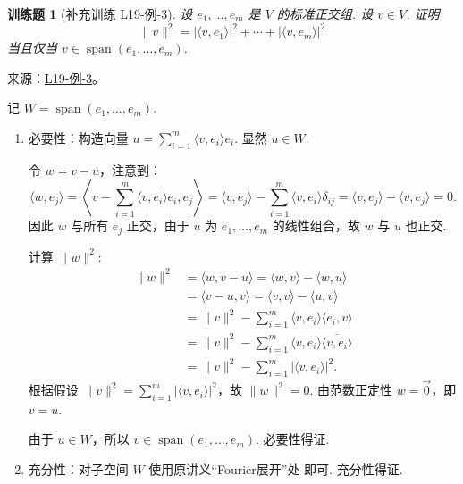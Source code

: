 \documentclass[12pt,fontset=fandol]{ctexart}
\newtheorem{exercise}{训练题}[section]
\begin{document}
\begin{exercise}[补充训练 L19-例-3]\label{prob:L19-例-3}
设 $e_1, \ldots , e_m$ 是 $ V $ 的标准正交组. 设 $ v \in V $. 证明
    \[ \lVert v \rVert^2 = \lvert \langle v, e_1\rangle \rvert^2 + \cdots + \lvert \langle v, e_m\rangle \rvert^2 \]
    当且仅当 $ v \in \operatorname{span}(e_1, \ldots , e_m)$.
\end{exercise}
\noindent 来源：\href{https://github.com/yhwu-is/Linear-Algebra-Left-Undone/blob/new/%E8%AE%B2%E4%B9%89/%E4%B8%93%E9%A2%98/19%20%E5%86%85%E7%A7%AF%E7%A9%BA%E9%97%B4.tex}{L19-例-3}。
\begin{solve}
记 $W = \operatorname{span}(e_1, \ldots , e_m)$.
    \begin{enumerate}
        \item 必要性：构造向量 $u = \displaystyle\sum_{i=1}^{m} \langle v, e_i \rangle e_i$. 显然 $u \in W$.

        令 $w = v - u$，注意到：
        \[
            \langle w, e_j \rangle = \left\langle v - \sum_{i=1}^{m} \langle v, e_i \rangle e_i, e_j \right\rangle = \langle v, e_j \rangle - \sum_{i=1}^{m} \langle v, e_i \rangle \delta_{ij} = \langle v, e_j \rangle - \langle v, e_j \rangle = 0.
        \]
        因此 $w$ 与所有 $e_j$ 正交，由于 $u$ 为 $e_1, \ldots , e_m$ 的线性组合，故 $w$ 与 $u$ 也正交.

        计算 $\lVert w \rVert^2$:
        \begin{align*}
            \|w\|^2 &= \langle w, v-u \rangle = \langle w, v \rangle - \langle w, u \rangle \\
            &= \langle v-u, v \rangle = \langle v, v \rangle - \langle u, v \rangle \\
            &= \|v\|^2 - \sum_{i=1}^{m} \langle v, e_i \rangle \langle e_i, v \rangle \\
            &= \|v\|^2 - \sum_{i=1}^{m} \langle v, e_i \rangle \overline{\langle v, e_i \rangle} \\
            &= \|v\|^2 - \sum_{i=1}^{m} |\langle v, e_i \rangle|^2.
        \end{align*}
        根据假设 $\lVert v \rVert^2 = \displaystyle\sum_{i=1}^{m} \lvert \langle v, e_i \rangle \rvert^2$，故 $\lVert w \rVert^2 = 0$.
        由范数正定性 $w = \vec{0}$，即 $v = u$.

        由于 $u \in W$，所以 $v \in \operatorname{span}(e_1, \ldots , e_m)$. 必要性得证.

        \item 充分性：对子空间 $W$ 使用原讲义“Fourier展开”处 即可. 充分性得证.
    \end{enumerate}
\end{solve}
\end{document}
